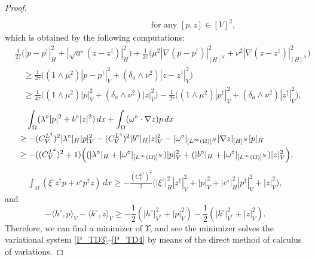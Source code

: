 \documentclass{sinst}
\numberwithin{equation}{section}
\theoremstyle{plain}
\theoremstyle{definition}
\def\dual#1{\langle #1 \rangle}
\begin{document}
\begin{proof}
\begin{align}
    \\
    &\qquad\qquad\qquad\qquad \mbox{ for any } [p,z] \in [V]^2,
  \end{align}
  which is obtained by the following computations:
  \begin{align}
    &\frac{1}{2\tau} \bigl(|p - p^\dagger|_H^2 + |\sqrt{a^\circ}(z - z^\dagger)|_H^2\bigr) + \frac{1}{2\tau} \bigl(\mu^2|\nabla(p - p^\dagger)|_{[H]^N}^2 + \nu^2|\nabla (z - z^\dagger)|_{[H]^N}^2\bigr)
    \\
    &\quad \geq \frac{1}{2 \tau}\bigl( (1 \wedge \mu^2)|p - p^\dagger|_V^2 + (\delta_a \wedge \nu^2) |z - z^\dagger|_V^2 \bigr)
    \\
    &\quad \geq \frac{1}{4 \tau}\bigl( (1 \wedge \mu^2)|p|_V^2 + (\delta_a \wedge \nu^2) |z|_V^2 \bigr) - \frac{1}{2 \tau}\bigl( (1 \wedge \mu^2)|p^\dagger|_V^2 + (\delta_a \wedge \nu^2) |z^\dagger|_V^2 \bigr),
  \end{align}
  \begin{align}
    &\quad \int_\Omega (\lambda^\circ |p|^2 + b^\circ |z|^2) \,dx + \int_\Omega (\omega^\circ \cdot \nabla z) p \,dx
    \\
    &\geq -(C_V^{L^4})^2 |\lambda^\circ|_H |p|_V^2 - (C_V^{L^4})^2 |b^\circ|_H |z|_V^2 - |\omega^\circ|_{[L^\infty(\Omega)]^N} |\nabla z|_{[H]^N} |p|_H
    \\
    &\geq -((C_V^{L^4})^2 + 1) \Bigl((|\lambda^\circ|_H + |\omega^\circ|_{[L^\infty(\Omega)]^N}) |p|_V^2 + (|b^\circ|_H + |\omega^\circ|_{[L^\infty(\Omega)]^N}) |z|_V^2 \Bigr),
  \end{align}
  \begin{align}
    \int_\Omega (\xi^\circ z^\dagger p + c^\circ p^\dagger z) \,dx \geq -\frac{(C_V^{L^4})^2}{2} \bigl( |\xi^\circ|_H^2 |z^\dagger|_V^2 + |p|_V^2 + |c^\circ|_H^2 |p^\dagger|_V^2 + |z|_V^2 \bigr),
  \end{align}
  and 
  \begin{equation}
    -\dual{h^\circ,p}_V - \dual{k^\circ,z}_V \geq -\frac{1}{2}(|h^\circ|_{V^*}^2 + |p|_V^2) - \frac{1}{2}(|k^\circ|_{V^*}^2 + |z|_V^2).
  \end{equation}
  Therefore, we can find a minimizer of $\Upsilon$, and see the minimizer solves the variational system \eqref{P_TD3}--\eqref{P_TD4} by means of the direct method of calculus of variations.


\end{proof}
\end{document}
